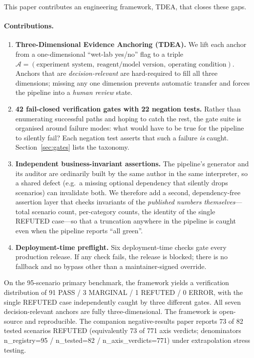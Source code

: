 \documentclass[review,3p]{elsarticle}
\begin{document}
This paper contributes an engineering framework, TDEA, that closes these gaps.

\paragraph{Contributions.}
\begin{enumerate}
    \item \textbf{Three-Dimensional Evidence Anchoring (TDEA).} We lift each anchor from a one-dimensional ``wet-lab yes/no'' flag to a triple $\mathcal{A} = (\text{experiment system},\ \text{reagent/model version},\ \text{operating condition})$. Anchors that are \emph{decision-relevant} are hard-required to fill all three dimensions; missing any one dimension prevents automatic transfer and forces the pipeline into a \emph{human review} state.
    \item \textbf{42 fail-closed verification gates with 22 negation tests.} Rather than enumerating successful paths and hoping to catch the rest, the gate suite is organised around failure modes: what would have to be true for the pipeline to silently fail? Each negation test asserts that such a failure \emph{is} caught. Section~\ref{sec:gates} lists the taxonomy.
    \item \textbf{Independent business-invariant assertions.} The pipeline's generator and its auditor are ordinarily built by the same author in the same interpreter, so a shared defect (e.g.\ a missing optional dependency that silently drops scenarios) can invalidate both. We therefore add a second, dependency-free assertion layer that checks invariants of the \emph{published numbers themselves}---total scenario count, per-category counts, the identity of the single REFUTED case---so that a truncation anywhere in the pipeline is caught even when the pipeline reports ``all green''.
    \item \textbf{Deployment-time preflight.} Six deployment-time checks gate every production release. If any check fails, the release is blocked; there is no fallback and no bypass other than a maintainer-signed override.
\end{enumerate}

On the 95-scenario primary benchmark, the framework yields a verification distribution of 91 PASS / 3 MARGINAL / 1 REFUTED / 0 ERROR, with the single REFUTED case independently caught by three different gates. All seven decision-relevant anchors are fully three-dimensional. The framework is open-source and reproducible. The companion negative-results paper reports 73 of 82 tested scenarios REFUTED (equivalently 73 of 771 axis verdicts; denominators n\_registry=95 / n\_tested=82 / n\_axis\_verdicts=771) under extrapolation stress testing.
\end{document}
